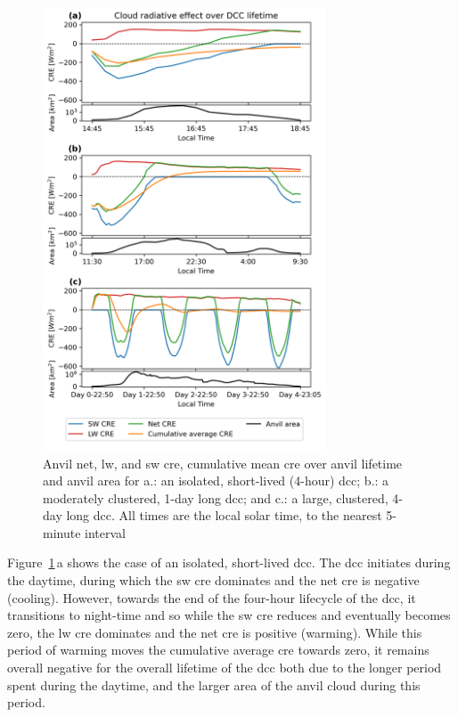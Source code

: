 \begin{figure}[tp]
    \centering
    \includegraphics[width=0.75\textwidth]{figures/ch3_10.png}
    \caption[
    Anvil net, \acrshort{lw}, and \acrshort{sw} \acrshort{cre}, cumulative mean \acrshort{cre} over anvil lifetime
    ]{
    Anvil net, \acrshort{lw}, and \acrshort{sw} \acrshort{cre}, cumulative mean \acrshort{cre} over anvil lifetime and anvil area for a.: an isolated, short-lived (4-hour) \acrshort{dcc}; b.: a moderately clustered, 1-day long \acrshort{dcc}; and c.: a large, clustered, 4-day long \acrshort{dcc}. All times are the local solar time, to the nearest 5-minute interval
    }
    \label{fig:cre_lifecycle_examples}
\end{figure}


Figure~\ref{fig:cre_lifecycle_examples}\,a shows the case of an isolated, short-lived \acrshort{dcc}. 
The \acrshort{dcc} initiates during the daytime, during which the \acrshort{sw} \acrshort{cre} dominates and the net \acrshort{cre} is negative (cooling). 
However, towards the end of the four-hour lifecycle of the \acrshort{dcc}, it transitions to night-time and so while the \acrshort{sw} \acrshort{cre} reduces and eventually becomes zero, the \acrshort{lw} \acrshort{cre} dominates and the net \acrshort{cre} is positive (warming). 
While this period of warming moves the cumulative average \acrshort{cre} towards zero, it remains overall negative for the overall lifetime of the \acrshort{dcc} both due to the longer period spent during the daytime, and the larger area of the anvil cloud during this period.

